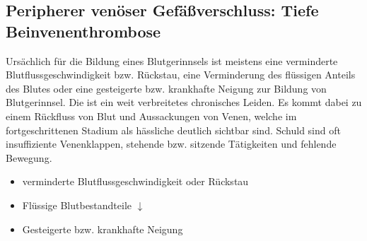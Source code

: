 \subsection{Peripherer venöser Gefäßverschluss: 
Tiefe Beinvenenthrombose}
\label{topic:venenthrombose}
\label{topic:thrombose}




{%
Ursächlich für die Bildung eines Blutgerinnsels ist meistens
eine verminderte Blutflussgeschwindigkeit bzw. Rückstau,
eine Verminderung des flüssigen Anteils des Blutes oder eine gesteigerte bzw.
krankhafte Neigung zur Bildung von Blutgerinnsel. Die  ist ein weit verbreitetes chronisches Leiden.
 Es kommt dabei zu einem Rückfluss von Blut und Aussackungen
 von Venen, welche im fortgeschrittenen Stadium als hässliche
 deutlich sichtbar sind. Schuld sind oft
insuffiziente Venenklappen, stehende bzw. sitzende
Tätigkeiten und fehlende Bewegung.

}{
\begin{itemize}
  \item verminderte Blutflussgeschwindigkeit oder Rückstau
  \item Flüssige Blutbestandteile
  $\downarrow$ 
  \item Gesteigerte bzw. krankhafte Neigung
\end{itemize}
}{}{}{}



